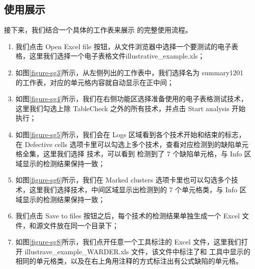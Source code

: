 \subsection{使用展示}
接下来，我们结合一个具体的工作表来展示 \sg 的完整使用流程。

\begin{enumerate}
    \item 我们点击 Open Excel file 按钮，从文件浏览器中选择一个要测试的电子表格，这里我们选择一个电子表格文件illustrative\_example.xls；
    
    \item 如图\ref{figure-sg3}所示，从左侧列出的工作表中，我们选择名为 summary1201 的工作表，对应的单元格内容就自动显示在正中间；
    
    \item 如图\ref{figure-sg4}所示，我们在右侧功能区选择准备使用的电子表格测试技术，这里我们勾选上除 TableCheck 之外的所有技术，并点击 Start analysis 开始执行；
    
    \item 如图\ref{figure-sg5}所示，我们会在 Logs 区域看到各个技术开始和结束的标志，在 Defective cells 选项卡里可以勾选上多个技术，查看对应检测到的缺陷单元格全集，这里我们选择 \wa 技术，可以看到 \wa 检测到了 7 个缺陷单元格，与 Info 区域显示的检测结果保持一致；
    
    \item 如图\ref{figure-sg6}所示，我们在 Marked clusters 选项卡里也可以勾选多个技术，这里我们选择\wa 技术，中间区域显示出\wa 检测到的 7 个单元格类，与 Info 区域显示的检测结果保持一致；
    
    \item 我们点击 Save to files 按钮之后，每个技术的检测结果单独生成一个 Excel 文件，和源文件放在同一个目录下；
    
    \item 如图\ref{figure-sg8}所示，我们点开任意一个工具标注的 Excel 文件，这里我们打开 illustrave\_example\_WARDER.xls 文件，该文件中标注了和 \sg 工具中显示的相同的单元格类，以及在右上角用注释的方式标注出有公式缺陷的单元格。
\end{enumerate}